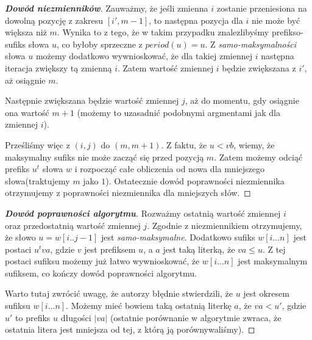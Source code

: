 \documentclass{article}
\begin{document}
\begin{proof}[\textbf{Dowód niezmienników}]
Zauważmy, że jeśli zmienna $i$ zostanie przeniesiona na dowolną pozycję z zakresu $[i', m-1]$, to następna pozycja dla $i$ nie może być większa niż $m$.
Wynika to z tego, że w takim przypadku znalezlibyśmy prefikso-sufiks słowa $u$, co byłoby sprzeczne z
$period(u) = u$. Z \textit{samo-maksymalności} słowa $u$ możemy dodatkowo wywnioskować, że dla takiej zmiennej $i$
następna iteracja zwiększy tą zmienną $i$. Zatem wartość zmiennej $i$ będzie zwiększana z $i'$, aż osiągnie $m$.

Następnie zwiększana będzie wartość zmiennej $j$, aż do momentu, gdy osiągnie ona wartość $m+1$ (możemy to 
uzasadnić podobnymi argmentami jak dla zmiennej $i$). 

Prześliśmy więc z $(i, j)$ do $(m, m+1)$. Z faktu, że $u < vb$, wiemy, że maksymalny sufiks 
nie może zacząć się przed pozycją $m$. Zatem 
możemy odciąć prefiks $u^t$ słowa $w$ i rozpocząć całe obliczenia od nowa dla mniejszego słowa(traktujemy $m$ jako $1$).
Ostatecznie dowód poprawności niezmiennika otrzymujemy z poprawności niezmiennika dla mniejszych słów.
\end{proof}

\begin{proof}[\textbf{Dowód poprawności algorytmu}]
Rozważmy ostatnią wartość zmiennej $i$\\ oraz przedostatnią wartość zmiennej $j$.
Zgodnie z niezmiennikiem otrzymujemy, że słowo $u = w[i..j-1]$ jest \textit{samo-maksymalne}.
Dodatkowo sufiks $w[i\ldots n]$ jest postaci $u^tva$, gdzie $v$ jest prefiksem $u$, a $a$ jest taką literką, że $va \leq u$. 
Z tej postaci sufiksu możemy już łatwo wywnioskować, że $w[i\ldots n]$  jest maksymalnym sufiksem, co kończy dowód poprawności algorytmu.

Warto tutaj zwrócić uwagę, że autorzy błędnie stwierdzili, że $u$ jest okresem sufiksu $w[i\ldots n]$. Możemy mieć bowiem
taką ostatnią literkę $a$, że $va < u'$, gdzie $u'$ to prefiks $u$ długości $|va|$ (ostatnie porównanie w algorytmie zwraca, że ostatnia litera jest mniejsza od tej, z którą ją porównywaliśmy).
\end{proof}
\end{document}
